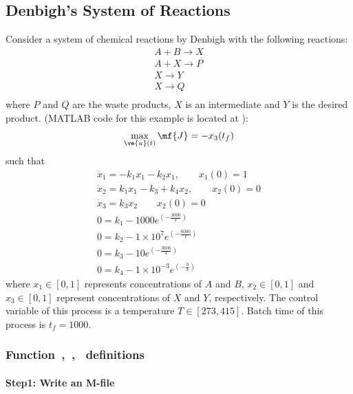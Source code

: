 \documentclass[a4paper,12pt,oneside]{book}
\begin{document}
	
\subsection*{Denbigh's System of Reactions}
\label{sec:brpdae}

Consider a system of chemical reactions by Denbigh with the 
following reactions:
\begin{gather}
 A + B \rightarrow X \\
 A + X \rightarrow P \\
 X \rightarrow Y \\
 X \rightarrow Q \\
 \end{gather}
where $P$ and $Q$ are the waste products, $X$ is an intermediate and $Y$ is the desired product.
(MATLAB code for this example is located
at ):
\begin{equation}
\max_{\ve{u}(t)} \mf{J} = -x_{3}(t_{f}) \label{eq:denbigh_dae}
\end{equation}
such that
\begin{gather}
\dot{x}_{1} = -k_{1}x_{1} -k_{2}x_{1} , \qquad x_1(0) = 1 \\
\dot{x}_{2} = k_{1}x_{1} - k_{3} + k_{4}x_{2}, \qquad x_2(0) = 0 \\
\dot{x}_{3} = k_{3}x_{2}  \qquad x_2(0) = 0 \\
0 = k_{1} - 1000 e^{(-\frac{3000}{T})} \\
0 = k_{2} - 1 \times 10^{7} e^{(-\frac{6000}{T})} \\
0 = k_{3} - 10e^{(-\frac{3000}{T})} \\
0 = k_{4} - 1 \times 10^{-3} e^{(-\frac{0}{T})} 
\end{gather} where $x_{1} \in [0, 1] $  represents concentrations
of $A$ and $B$, $x_{2} \in [0, 1] $ and $x_{3} \in [0, 1]$  represent concentrations
of $X$ and $Y$, respectively. The control variable of this process is a temperature $T \in [273, 415]$.
Batch time of this process is $t_{f} = 1000$. 

\subsubsection{Function~,~,~  definitions}
\label{sec:example-fundef}

\paragraph{Step1: Write an M-file~}
\end{document}
